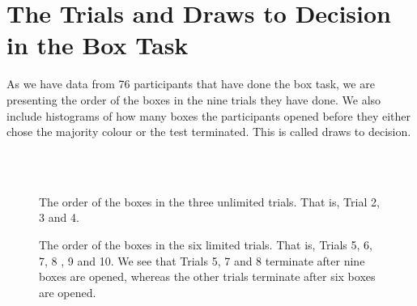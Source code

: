 \newpage
\appendix
\chapter[Trials and Draws To Decision]{The Trials and Draws to Decision in the Box Task}
\label{appendix_a}

As we have data from 76 participants that have done the box task, we are presenting the order of the boxes in the nine trials they have done. We also include histograms of how many boxes the participants opened before they either chose the majority colour or the test terminated. This is called draws to decision. 

\begin{figure}
    \centering
    \scalebox{0.8}{}\\
    \vspace{0.1cm}
    \scalebox{0.8}{}\\
    \vspace{0.1cm}
    \scalebox{0.8}{}
    \caption[Order of boxes in the unlimited trials]{The order of the boxes in the three unlimited trials. That is, Trial 2, 3 and 4.}
    \label{fig:unlimited_trials_order}
\end{figure}

\begin{figure}
    \centering
    \scalebox{0.8}{}
    \caption[Order of the boxes in the limited trials]{The order of the boxes in the six limited trials. That is, Trials 5, 6, 7, 8 , 9 and 10. We see that Trials 5, 7 and 8 terminate after nine boxes are opened, whereas the other trials terminate after six boxes are opened.}
    \label{fig:all_limited_trials_order}
\end{figure}


